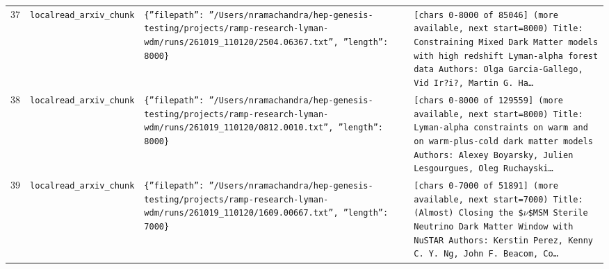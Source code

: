 \documentclass[11pt,a4paper]{article}
\begin{document}
\begin{longtable}{@{}p{}p{}p{}p{}@{}}
37 & \texttt{local}\newline\texttt{read\_\allowbreak{}arxiv\_\allowbreak{}chunk} & \texttt{\{''filepath'':\allowbreak{} ''/\allowbreak{}Users/\allowbreak{}nramachandra/\allowbreak{}hep-genesis-testing/\allowbreak{}projects/\allowbreak{}ramp-research-lyman-wdm/\allowbreak{}runs/\allowbreak{}261019\_\allowbreak{}110120/\allowbreak{}2504.06367.txt'',\allowbreak{} ''length'':\allowbreak{} 8000\}\allowbreak{}} & \texttt{[chars 0-8000 of 85046]\allowbreak{} (more available,\allowbreak{} next start=\allowbreak{}8000)\allowbreak{}  Title:\allowbreak{} Constraining Mixed Dark Matter models with high redshift Lyman-alpha forest data Authors:\allowbreak{} Olga Garcia-Gallego,\allowbreak{} Vid Ir?i?,\allowbreak{} Martin G. Ha\ldots{}\allowbreak{}} \\
38 & \texttt{local}\newline\texttt{read\_\allowbreak{}arxiv\_\allowbreak{}chunk} & \texttt{\{''filepath'':\allowbreak{} ''/\allowbreak{}Users/\allowbreak{}nramachandra/\allowbreak{}hep-genesis-testing/\allowbreak{}projects/\allowbreak{}ramp-research-lyman-wdm/\allowbreak{}runs/\allowbreak{}261019\_\allowbreak{}110120/\allowbreak{}0812.0010.txt'',\allowbreak{} ''length'':\allowbreak{} 8000\}\allowbreak{}} & \texttt{[chars 0-8000 of 129559]\allowbreak{} (more available,\allowbreak{} next start=\allowbreak{}8000)\allowbreak{}  Title:\allowbreak{} Lyman-alpha constraints on warm and on warm-plus-cold dark matter models Authors:\allowbreak{} Alexey Boyarsky,\allowbreak{} Julien Lesgourgues,\allowbreak{} Oleg Ruchayski\ldots{}\allowbreak{}} \\
39 & \texttt{local}\newline\texttt{read\_\allowbreak{}arxiv\_\allowbreak{}chunk} & \texttt{\{''filepath'':\allowbreak{} ''/\allowbreak{}Users/\allowbreak{}nramachandra/\allowbreak{}hep-genesis-testing/\allowbreak{}projects/\allowbreak{}ramp-research-lyman-wdm/\allowbreak{}runs/\allowbreak{}261019\_\allowbreak{}110120/\allowbreak{}1609.00667.txt'',\allowbreak{} ''length'':\allowbreak{} 7000\}\allowbreak{}} & \texttt{[chars 0-7000 of 51891]\allowbreak{} (more available,\allowbreak{} next start=\allowbreak{}7000)\allowbreak{}  Title:\allowbreak{} (Almost)\allowbreak{} Closing the \$$\nu$\$MSM Sterile Neutrino Dark Matter Window with NuSTAR Authors:\allowbreak{} Kerstin Perez,\allowbreak{} Kenny C. Y. Ng,\allowbreak{} John F. Beacom,\allowbreak{} Co\ldots{}\allowbreak{}} \\

\end{longtable}
\end{document}
